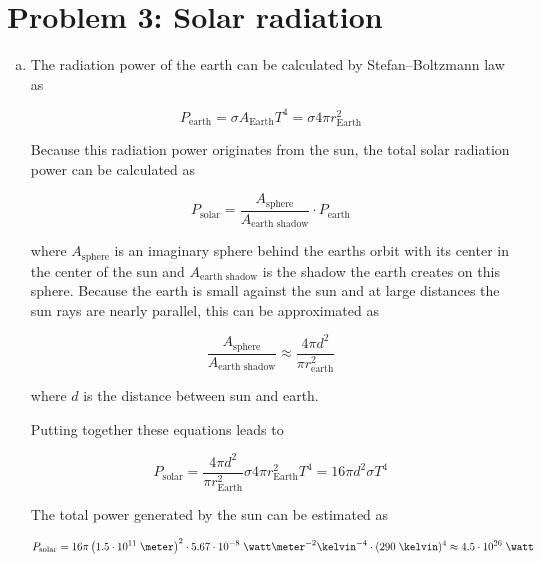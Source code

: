 \documentclass[a4paper,german,12pt,smallheadings]{scrartcl}
\begin{document}
\section*{Problem 3: Solar radiation}
\begin{enumerate}[a)]
  \item
    The radiation power of the earth can be calculated by Stefan–Boltzmann law as

    \begin{equation*}
      P_{\text{earth}} = \sigma A_{\text{Earth}} T^4 = \sigma 4 \pi r_{\text{Earth}}^2
    \end{equation*}

    Because this radiation power originates from the sun, the total solar
    radiation power can be calculated as

    \begin{equation*}
      P_{\text{solar}} = \frac{A_{\text{sphere}}}{A_{\text{earth shadow}}} \cdot P_{\text{earth}}
    \end{equation*}

    where $A_{\text{sphere}}$ is an imaginary sphere behind the earths orbit
    with its center in the center of the sun and $A_{\text{earth shadow}}$ is
    the shadow the earth creates on this sphere. Because the earth is small
    against the sun and at large distances the sun rays are nearly parallel,
    this can be approximated as

    \begin{equation*}
      \frac{A_{\text{sphere}}}{A_{\text{earth shadow}}} \approx \frac{4 \pi d^2}{\pi r_{\text{earth}}^2}
    \end{equation*}

    where $d$ is the distance between sun and earth.

    Putting together these equations leads to

    \begin{equation*}
      P_\text{solar} = \frac{4 \pi d^2}{\pi r_\text{Earth}^2} \sigma 4 \pi r_\text{Earth}^2 T^4 = 16\pi d^2 \sigma T^4
    \end{equation*}

    The total power generated by the sun can be estimated as

    \begin{equation*}
      P_\text{solar} = 16 \pi \left(1.5 \cdot 10^{11} \; \meter\right)^2 \cdot 5.67 \cdot 10^{-8}\;\watt\meter^{-2}\kelvin^{-4} \cdot (290 \; \kelvin)^4 \approx 4.5 \cdot 10^{26}\;\watt
    \end{equation*}
\end{enumerate}
\end{document}
